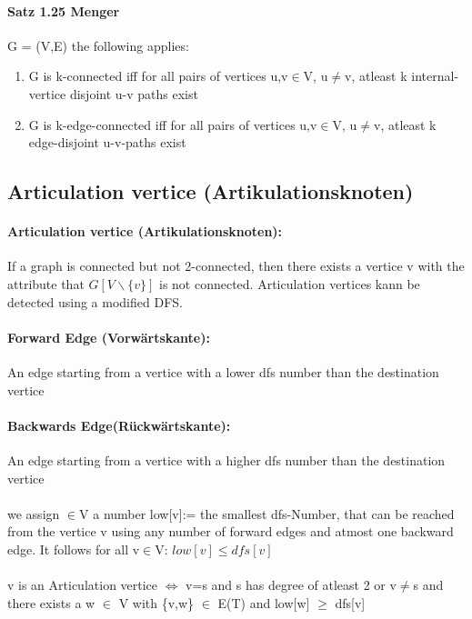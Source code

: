 \documentclass[8pt]{extreport}
\begin{document}
\paragraph{Satz 1.25 Menger} G = (V,E) the following applies:
\begin{enumerate}
\item G is k-connected iff for all pairs of vertices u,v$\in$V, u$\neq$v, atleast k internal-vertice disjoint u-v paths exist
\item G is k-edge-connected iff for all pairs of vertices u,v$\in$V, u$\neq$v, atleast k edge-disjoint u-v-paths exist
\end{enumerate}
\subsection{Articulation vertice (Artikulationsknoten)}
\paragraph{Articulation vertice (Artikulationsknoten):} If a graph is connected but not 2-connected, then there exists a vertice v with the attribute that $G[V\backslash \{v\}]$ is not connected. Articulation vertices kann be detected using a modified DFS.
\paragraph{Forward Edge (Vorwärtskante):} An edge starting from a vertice with a lower dfs number than the destination vertice
\paragraph{Backwards Edge(Rückwärtskante):} An edge starting from a vertice with a higher dfs number than the destination vertice
\paragraph{} we assign $\in$V a number low[v]:= the smallest dfs-Number, that can be reached from the vertice v using any number of forward edges and atmost one backward edge. It follows for all v$\in$V: $low[v]\leq dfs[v]$ 
\paragraph{} v is an Articulation vertice $\Leftrightarrow$ v=s and s has degree of atleast 2 or v$\neq$s and there exists a w $\in$ V with \{v,w\} $\in$ E(T) and low[w] $\geq$ dfs[v] 
\end{document}
